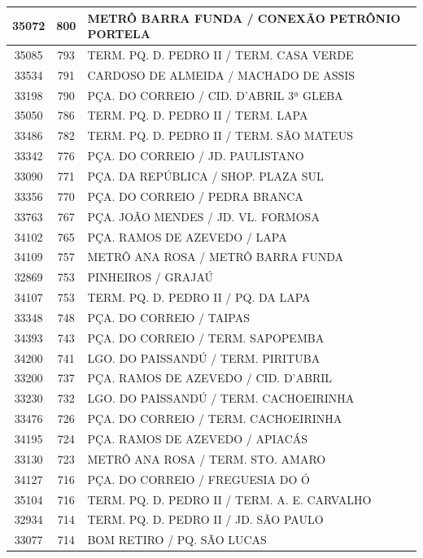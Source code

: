 \documentclass[
	12pt,				%
	oneside,			%
	a4paper,			%
	english,			%
	brazil				%
	]{abntex2ppgsi}
\begin{document}
{{{\begin{apendicesenv}
\begin{longtable}{c|c|p{7cm}}
 \hline 
35072 &	800 &	METRÔ BARRA FUNDA / CONEXÃO PETRÔNIO PORTELA \\ 
 \hline 
35085 &	793 &	TERM. PQ. D. PEDRO II / TERM. CASA VERDE \\ 
 \hline 
33534 &	791 &	CARDOSO DE ALMEIDA / MACHADO DE ASSIS \\ 
 \hline 
33198 &	790 &	PÇA. DO CORREIO / CID. D'ABRIL 3ª GLEBA \\ 
 \hline 
35050 &	786 &	TERM. PQ. D. PEDRO II / TERM. LAPA \\ 
 \hline 
33486 &	782 &	TERM. PQ. D. PEDRO II / TERM. SÃO MATEUS \\ 
 \hline 
33342 &	776 &	PÇA. DO CORREIO / JD. PAULISTANO \\ 
 \hline 
33090 &	771 &	PÇA. DA REPÚBLICA / SHOP. PLAZA SUL \\ 
 \hline 
33356 &	770 &	PÇA. DO CORREIO / PEDRA BRANCA \\ 
 \hline 
33763 &	767 &	PÇA. JOÃO MENDES / JD. VL. FORMOSA \\ 
 \hline 
34102 &	765 &	PÇA. RAMOS DE AZEVEDO / LAPA \\ 
 \hline 
34109 &	757 &	METRÔ ANA ROSA / METRÔ BARRA FUNDA \\ 
 \hline 
32869 &	753 &	PINHEIROS / GRAJAÚ \\ 
 \hline 
34107 &	753 &	TERM. PQ. D. PEDRO II / PQ. DA LAPA \\ 
 \hline 
33348 &	748 &	PÇA. DO CORREIO / TAIPAS \\ 
 \hline 
34393 &	743 &	PÇA. DO CORREIO / TERM. SAPOPEMBA \\ 
 \hline 
34200 &	741 &	LGO. DO PAISSANDÚ / TERM. PIRITUBA \\ 
 \hline 
33200 &	737 &	PÇA. RAMOS DE AZEVEDO / CID. D'ABRIL \\ 
 \hline 
33230 &	732 &	LGO. DO PAISSANDÚ / TERM. CACHOEIRINHA \\ 
 \hline 
33476 &	726 &	PÇA. DO CORREIO / TERM. CACHOEIRINHA \\ 
 \hline 
34195 &	724 &	PÇA. RAMOS DE AZEVEDO / APIACÁS \\ 
 \hline 
33130 &	723 &	METRÔ ANA ROSA / TERM. STO. AMARO \\ 
 \hline 
34127 &	716 &	PÇA. DO CORREIO / FREGUESIA DO Ó \\ 
 \hline 
35104 &	716 &	TERM. PQ. D. PEDRO II / TERM. A. E. CARVALHO \\ 
 \hline 
32934 &	714 &	TERM. PQ. D. PEDRO II / JD. SÃO PAULO \\ 
 \hline 
33077 &	714 &	BOM RETIRO / PQ. SÃO LUCAS \\ 

\end{longtable}
\end{apendicesenv}}}}
\end{document}
